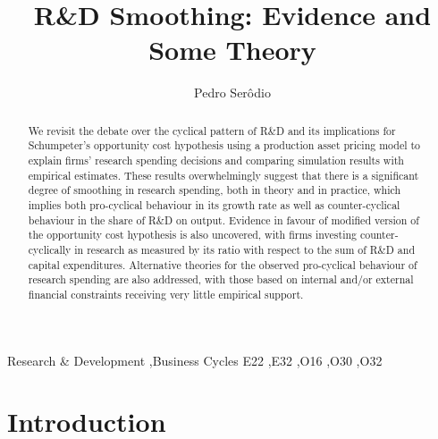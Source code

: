 \documentclass{_latex/house}
\begin{document}
\begin{frontmatter}

\title{R\&D Smoothing: Evidence and Some Theory}

\author[essex]{Pedro Ser\^odio}
\address[essex]{Department of Economics, University of Warwick}

\begin{abstract}
We revisit the debate over the cyclical pattern of R\&D and its implications for Schumpeter's opportunity cost hypothesis using a production asset pricing model to explain firms' research spending decisions and comparing simulation results with empirical estimates. These results overwhelmingly suggest that there is a significant degree of smoothing in research spending, both in theory and in practice, which implies both pro-cyclical behaviour in its growth rate as well as counter-cyclical behaviour in the share of R\&D on output. Evidence in favour of modified version of the opportunity cost hypothesis is also uncovered, with firms investing counter-cyclically in research as measured by its ratio with respect to the sum of R\&D and capital expenditures. Alternative theories for the observed pro-cyclical behaviour of research spending are also addressed, with those based on internal and/or external financial constraints receiving very little empirical support.
\end{abstract}

\begin{keyword}
Research \& Development \sep Business Cycles
\JEL E22 \sep E32 \sep O16 \sep O30 \sep O32
\end{keyword}

\end{frontmatter}

\fctlogo[5in]

\pagebreak


\section{Introduction} \label{introduction}
\end{document}
